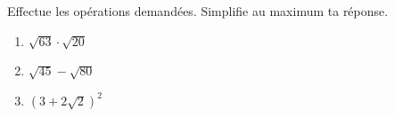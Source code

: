 %
%
    Effectue les opérations demandées. Simplifie au maximum ta réponse.
    \begin{enumerate}[cols=3]
        \item $\sqrt{63}\cdot\sqrt{20}$
        \item $\sqrt{45}-\sqrt{80}$
        \item $\left(3 + 2\sqrt{2}\right)^2$
    \end{enumerate}

